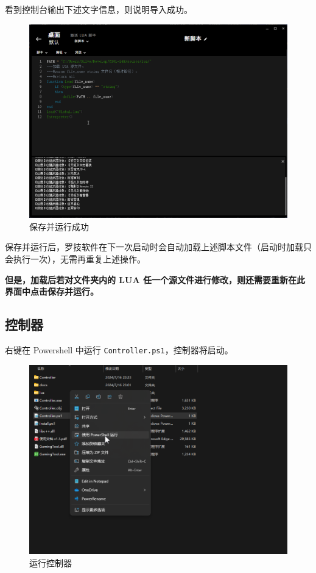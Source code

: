 看到控制台输出下述文字信息，则说明导入成功。

\begin{figure}[H]
    \Centering
    \includegraphics[width=\textwidth]{docs/assets/success.png}
    \caption{保存并运行成功}
\end{figure}

保存并运行后，罗技软件在下一次启动时会自动加载上述脚本文件（启动时加载只会执行一次），无需再重复上述操作。

\textbf{\color{red}但是，加载后若对文件夹内的 LUA 任一个源文件进行修改，则还需要重新在此界面中点击保存并运行。}

\subsection{控制器}

右键在 Powershell 中运行 \lstinline{Controller.ps1}，控制器将启动。

\begin{figure}[H]
    \Centering
    \includegraphics[width=\textwidth]{docs/assets/run_controller.png}
    \caption{运行控制器}
\end{figure}


